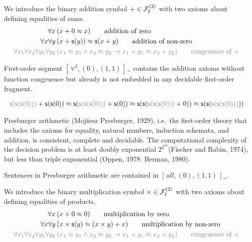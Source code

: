 \begin{definition}
	[Addition]\label{def:addition:axioms}
	We introduce the binary addition symbol \( +\in\mcFfn[2] \) with two axioms about defining equalities of sums.
\begin{align*}
\forall x\,
&(x+0 \mEQ x)
\tag*{addition of zero}\\
\forall x\forall y\,
&(x+\msucc(y)) \mEQ \msucc(x+y)
\tag*{addition of non-zero}
\\
\colG\forall x_1\forall x_2\forall y_1\forall y_2\,
&\colG (x_1\mEQ y_1\land x_2\mEQ y_2 \limp x_1+y_1\mEQ x_2+y_2)
\tag*{congruence of \( + \)}
\end{align*}
\end{definition}

\begin{remark}
	First-order segment
	\( [ \, \forall^2 , (0), (1,1) \, ]{}_{=} \)
	contains the addition axioms without function congruence but
	already is not embedded in any decidable first-order fragment.
\end{remark}

\begin{example}
	\begin{gather*}
	{\colG \msucc(\msucc(\msucc(0)))} + \msucc(\msucc(0))
	\mEQ\msucc({\colG \msucc(\msucc(\msucc(0)))} + \msucc(0))
	\mEQ \msucc(\msucc(
	{\colG \msucc(\msucc(\msucc(0)))} + 0))
	\mEQ \msucc(\msucc(
	{\colG \msucc(\msucc(\msucc(0)))}))
	\end{gather*}
	\end{example}

\begin{theorem}Presburger arithmetic (Moj\'{z}esz Presburger, 1929), i.e.~the first-order theory that includes the axioms for equality, natural numbers, induction schemata, and addition, is consistent, complete and decidable. The computational complexity of the decision problem is at least doubly exponential \( 2^{2^{cn}} \)(Fischer and Rabin, 1974), but less than triple exponential (Oppen, 1978. Berman, 1980).
\end{theorem}

\begin{remark}
	Sentences in Presburger arithmetic are contained in
	\( [ \, all , (0), (1,1) \, ]{}_{=} \).
\end{remark}

\begin{definition}
	[Multiplication]\label{tab:addition:axioms}
	We introduce the binary multiplication symbol \( \times\in\mcFfn[2] \)
	with two axioms about defining equalities of products.
	\begin{align*}
	\forall x\,
	&(x\times 0 \mEQ 0)
	\tag*{multiplication by zero}\\
	\forall x\forall y\,
	&(x\times\msucc(y) \mEQ (x\times y) + x)
	\tag*{multiplication by non-zero}
	\\
	\colG\forall x_1\forall x_2\forall y_1\forall y_2\,
	&\colG (x_1\mEQ y_1\land x_2\mEQ y_2 \limp x_1\times y_1\mEQ x_2 \times y_2)
	\tag*{congruence of \( \times \)}
	\end{align*}
\end{definition}

